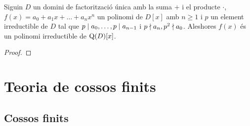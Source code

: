 \documentclass[../../Main.tex]{subfiles}
\begin{document}
	\begin{corollary}
		Siguin \(D\) un domini de factorització única amb la suma \(+\) i el producte \(\cdot\), \(f(x)=a_{0}+a_{1}x+\dots+a_{n}x^{n}\) un polinomi de \(D[x]\) amb \(n\geq1\) i \(p\) un element irreductible de \(D\) tal que \(p\mathrel{|} a_{0},\dots,p\mathrel{|} a_{n-1}\) i \(p\mathrel{\nmid} a_{n},p^{2}\mathrel{\nmid} a_{0}\). Aleshores \(f(x)\) és un polinomi irreductible de \(\operatorname{Q}(D)[x]\).
		\begin{proof}
		\end{proof}
	\end{corollary}
\chapter{Teoria de cossos finits}
\section{Cossos finits}
\end{document}
